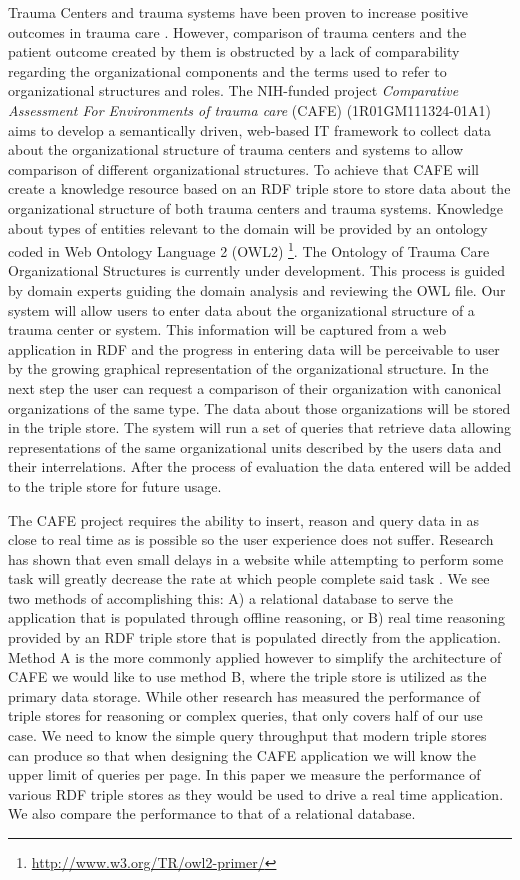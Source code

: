 \documentclass{llncs}
\begin{document}
Trauma Centers and trauma systems have been proven to increase positive outcomes in trauma care \cite{pmid16427544, pmid21206286, pmid26151508}. However, comparison of trauma centers and the patient outcome created by them is obstructed by a lack of comparability regarding the organizational components and the terms used to refer to organizational structures and roles. The NIH-funded project \textit{Comparative Assessment For Environments of trauma care} (CAFE) (1R01GM111324-01A1) aims to develop a semantically driven, web-based IT framework to collect data about the organizational structure of trauma centers and systems to allow comparison of different organizational structures. To achieve that CAFE will create a knowledge resource based on an RDF triple store to store data about the organizational structure of both trauma centers and trauma systems. Knowledge about types of entities relevant to the domain will be provided by an ontology coded in Web Ontology Language 2 (OWL2) \footnote{\url{http://www.w3.org/TR/owl2-primer/}}. The Ontology of Trauma Care Organizational Structures is currently under development. This process is guided by domain experts guiding the domain analysis and reviewing the OWL file. Our system will allow users to enter data about the organizational structure of a trauma center or system. This information will be captured from a web application in RDF and the progress in entering data will be perceivable to user by the growing graphical representation of the organizational structure. In the next step the user can request a comparison of their organization with canonical organizations of the same type. The data about those organizations will be stored in the triple store. The system will run a set of queries that retrieve data allowing representations of the same organizational units described by the users data and their interrelations. After the process of evaluation the data entered will be added to the triple store for future usage.

The CAFE project requires the ability to insert, reason and query data in as close to real time as is possible so the user experience does not suffer. Research has shown that even small delays in a website while attempting to perform some task will greatly decrease the rate at which people complete said task \cite{Galletta2002}.  We see two methods of accomplishing this: A) a relational database to serve the application that is populated through offline reasoning, or B) real time reasoning provided by an RDF triple store that is populated directly from the application. Method A is the more commonly applied however to simplify the architecture of CAFE we would like to use method B, where the triple store is utilized as the primary data storage. While other research has measured the performance of triple stores for reasoning or complex queries, that only covers half of our use case.  We need to know the simple query throughput that modern triple stores can produce so that when designing the CAFE application we will know the upper limit of queries per page. In this paper we measure the performance of various RDF triple stores as they would be used to drive a real time application. We also compare the performance to that of a relational database.
\end{document}
